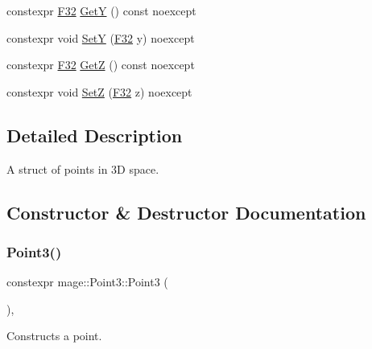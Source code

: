 \begin{DoxyCompactItemize}
\item 
constexpr \mbox{\hyperlink{namespacemage_aa97e833b45f06d60a0a9c4fc22ae02c0}{F32}} \mbox{\hyperlink{structmage_1_1_point3_a63a6f60b65b3c3b8fadc03f229f410a1}{GetY}} () const noexcept
\item 
constexpr void \mbox{\hyperlink{structmage_1_1_point3_a7ac2ea5fcd095cf86efa1597c0da270d}{SetY}} (\mbox{\hyperlink{namespacemage_aa97e833b45f06d60a0a9c4fc22ae02c0}{F32}} y) noexcept
\item 
constexpr \mbox{\hyperlink{namespacemage_aa97e833b45f06d60a0a9c4fc22ae02c0}{F32}} \mbox{\hyperlink{structmage_1_1_point3_a9dd6e12e7c66eb8b3ab8de6cfa13d612}{GetZ}} () const noexcept
\item 
constexpr void \mbox{\hyperlink{structmage_1_1_point3_a37225058268534202f89421467138668}{SetZ}} (\mbox{\hyperlink{namespacemage_aa97e833b45f06d60a0a9c4fc22ae02c0}{F32}} z) noexcept
\end{DoxyCompactItemize}


\subsection{Detailed Description}
A struct of points in 3D space. 

\subsection{Constructor \& Destructor Documentation}
\mbox{\label{structmage_1_1_point3_a5615d9dddc6cedf47df9047fd23b7833}} 
\subsubsection{\texorpdfstring{Point3()}{Point3()}\hspace{0.1cm}{\footnotesize\ttfamily [1/5]}}
{\footnotesize\ttfamily constexpr mage\+::\+Point3\+::\+Point3 (\begin{DoxyParamCaption}{ }\end{DoxyParamCaption})\hspace{0.3cm}{\ttfamily [default]}, {\ttfamily [noexcept]}}

Constructs a point. \mbox{\label{structmage_1_1_point3_ade2447542de93cfeeb7209cdfa3051e7}} 

